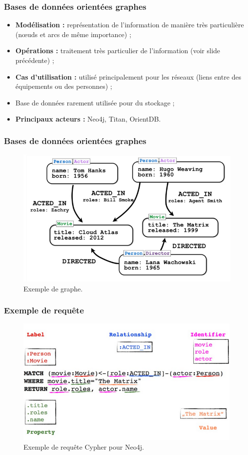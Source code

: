 	\begin{frame}
		\frametitle{Bases de données orientées graphes}

		\begin{itemize}
			\item \textbf{Modélisation :} représentation de l'information de manière très particulière (nœuds et arcs de même importance) ;
			\item \textbf{Opérations :} traitement très particulier de l'information (voir slide précédente) ;
			\item \textbf{Cas d'utilisation :} utilisé principalement pour les réseaux (liens entre des équipements ou des personnes) ;
			\item Base de données rarement utilisée pour du stockage ;
			\item \textbf{Principaux acteurs :} Neo4j, Titan, OrientDB.
		\end{itemize}
	\end{frame}

	\begin{frame}
		\frametitle{Bases de données orientées graphes}

		\begin{figure}[htb]
			\includegraphics[width=1\textwidth]{images/graphe.png}
			\caption{Exemple de graphe.}
		\end{figure}
	\end{frame}

	\begin{frame}
		\frametitle{Exemple de requête}

		\begin{figure}[htb]
			\includegraphics[width=1\textwidth]{images/requeteNeo4j.png}
			\caption{Exemple de requête Cypher pour Neo4j.}
		\end{figure}
	\end{frame}